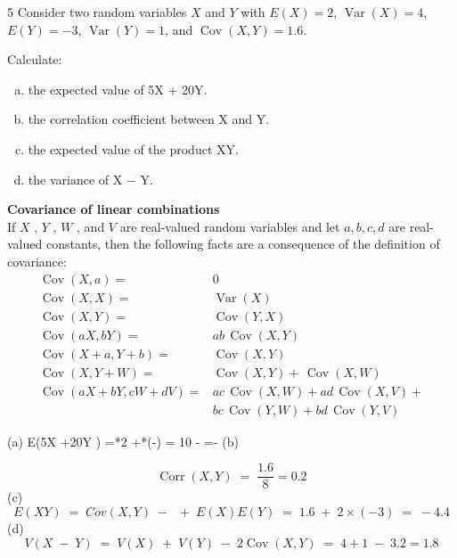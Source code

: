 \documentclass[a4paper,12pt]{article}
\begin{document}
5
Consider two random variables $X$ and $Y$ with $E(X) = 2$, $\operatorname {Var}(X) = 4$, $E(Y) = −3$, $\operatorname {Var}(Y) = 1$,
and $\operatorname {Cov}(X,Y) = 1.6$.

Calculate:

\begin{enumerate}[(a)]
\item the expected value of 5X + 20Y.
\item the correlation coefficient between X and Y.
\item the expected value of the product XY.
\item the variance of X − Y.
\end{enumerate}

\begin{framed}
\noindent \textbf{Covariance of linear combinations}\\
If 
$ {\displaystyle X} $
, 
$ {\displaystyle Y} $
, 
$ {\displaystyle W} $
, and 
${\displaystyle V}$
 are real-valued random variables and let 
${\displaystyle a,b,c,d}$ are real-valued constants, then the following facts are a consequence of the definition of covariance: 
\[
{\displaystyle {\begin{aligned}\operatorname {Cov} (X,a) =&0\\\operatorname {Cov} (X,X)=&\operatorname {Var} (X)\\\operatorname {Cov} (X,Y)=&\operatorname {Cov} (Y,X)\\\operatorname {Cov} (aX,bY)=&ab\,\operatorname {Cov} (X,Y)\\\operatorname {Cov} (X+a,Y+b)=&\operatorname {Cov} (X,Y)\\
\operatorname {Cov} (X,Y+W)=&\operatorname {Cov} (X,Y) + \,\operatorname {Cov} (X,W) \\
\operatorname {Cov} (aX+bY,cW+dV)=&ac\,\operatorname {Cov} (X,W)+ad\,\operatorname {Cov} (X,V) + \\& bc\,\operatorname {Cov} (Y,W)+bd\,\operatorname {Cov} (Y,V)\end{aligned}}} 
\]
\end{framed}
 (a) E(5X \;+\;20Y ) \;=*2 \;+*(\;-) = 10 \;- \;=\;\;-
(b) 

\[ \operatorname{Corr}( X,Y) \;=\; \frac{1.6}{8} = 0.2 \]
(c) \[E(XY ) \;=\;Cov (X ,Y) \;-\; \;+\;E(X )E(Y ) \;=\; 1.6 \;+\;2\times(-3) \;=\;-4.4\]
(d) \[V ( X \;-\;Y)  \;=\; V ( X) \;+\; V (Y)  \;-\; 2\operatorname{Cov}( X,Y) \;=\;4 + 1\;-\; 3.2 =1.8\]

\end{document}
